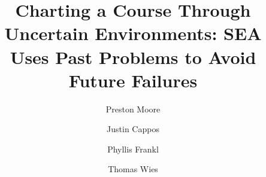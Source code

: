 \documentclass[final,twocolumn]{elsarticle}
\begin{document}
\begin{frontmatter}

\title{Charting a Course Through Uncertain Environments: SEA Uses Past Problems to Avoid Future Failures}

\address[add1]{New York University}
\author[add1]{Preston Moore}
\author[add1]{Justin Cappos}
\author[add1]{Phyllis Frankl}
\author[add1]{Thomas Wies}

\end{frontmatter}














\end{document}
